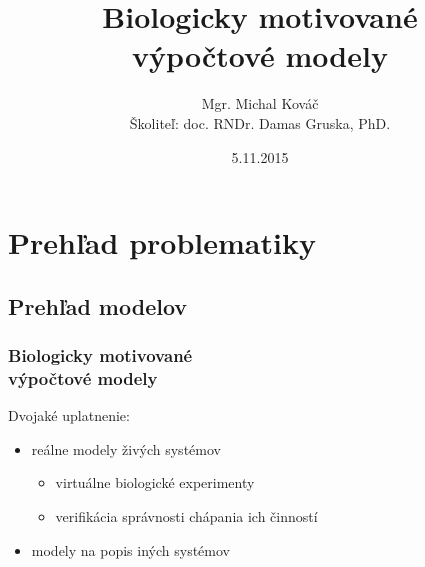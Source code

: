 \usepackage[utf8]{inputenc}

\usepackage{bibentry}
\nobibliography*
\usepackage{slovak}
\usepackage{tikz}
\usetikzlibrary{arrows,positioning}
\title{Biologicky motivované \\výpočtové modely}
\author[Mgr. Michal Kováč]{Mgr. Michal Kováč\\{\small Školiteľ: doc. RNDr. Damas Gruska, PhD.}}
\date{5.11.2015}


\begin{frame}[t]
\titlepage
\end{frame}

\begin{frame}
\tableofcontents
\end{frame}

\section{Prehľad problematiky} %
\label{sec:prehlad_problematiky}

\subsection{Prehľad modelov} %
\label{sub:prehlad_modelov}

\begin{frame}[t]\frametitle{Biologicky motivované \\výpočtové modely}
  Dvojaké uplatnenie:
  \begin{itemize}
    \item reálne modely živých systémov
    \begin{itemize}
      \item virtuálne biologické experimenty
      \item verifikácia správnosti chápania ich činností
    \end{itemize}
    \item modely na popis iných systémov
  \end{itemize}
\end{frame}


